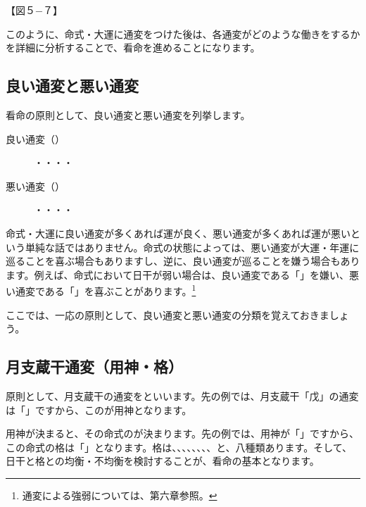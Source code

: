 \documentclass[a5paper,11pt,dvipdfmx]{tarticle}
\begin{document}
【図５−７】

このように、命式・大運に通変をつけた後は、各通変がどのような働きをするかを詳細に分析することで、看命を進めることになります。

\subsection{良い通変と悪い通変}
看命の原則として、良い通変と悪い通変を列挙します。
\begin{description}
\item[良い通変（）] ・・・・
\item[悪い通変（）] ・・・・
\end{description}
  
命式・大運に良い通変が多くあれば運が良く、悪い通変が多くあれば運が悪いという単純な話ではありません。命式の状態によっては、悪い通変が大運・年運に巡ることを喜ぶ場合もありますし、逆に、良い通変が巡ることを嫌う場合もあります。例えば、命式において日干が弱い場合は、良い通変である「」を嫌い、悪い通変である「」を喜ぶことがあります。\footnote{通変による強弱については、第六章参照。}

ここでは、一応の原則として、良い通変と悪い通変の分類を覚えておきましょう。

\subsection{月支蔵干通変（用神・格）}

原則として、月支蔵干の通変をといいます。先の例では、月支蔵干「戊」の通変は「」ですから、このが用神となります。

用神が決まると、その命式のが決まります。先の例では、用神が「」ですから、この命式の格は「」となります。格は、、、、、、、、と、八種類あります。そして、日干と格との均衡・不均衡を検討することが、看命の基本となります。\\
\end{document}
